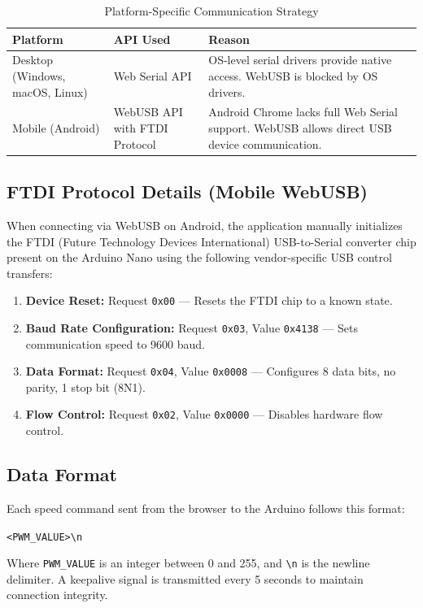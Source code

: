 \documentclass[12pt,a4paper]{article}
\begin{document}
\begin{table}[H]
\centering
\renewcommand{\arraystretch}{1.4}
\begin{tabular}{|>{\raggedright}p{3cm}|>{\raggedright}p{3.5cm}|>{\raggedright\arraybackslash}p{6cm}|}
\hline
\textbf{Platform} & \textbf{API Used} & \textbf{Reason} \\
\hline
Desktop (Windows, macOS, Linux) & Web Serial API & OS-level serial drivers provide native access. WebUSB is blocked by OS drivers. \\
\hline
Mobile (Android) & WebUSB API with FTDI Protocol & Android Chrome lacks full Web Serial support. WebUSB allows direct USB device communication. \\
\hline
\end{tabular}
\caption{Platform-Specific Communication Strategy}
\label{tab:protocol}
\end{table}

\subsection{FTDI Protocol Details (Mobile WebUSB)}
When connecting via WebUSB on Android, the application manually initializes the FTDI (Future Technology Devices International) USB-to-Serial converter chip present on the Arduino Nano using the following vendor-specific USB control transfers:

\begin{enumerate}
    \item \textbf{Device Reset:} Request \texttt{0x00} --- Resets the FTDI chip to a known state.
    \item \textbf{Baud Rate Configuration:} Request \texttt{0x03}, Value \texttt{0x4138} --- Sets communication speed to 9600 baud.
    \item \textbf{Data Format:} Request \texttt{0x04}, Value \texttt{0x0008} --- Configures 8 data bits, no parity, 1 stop bit (8N1).
    \item \textbf{Flow Control:} Request \texttt{0x02}, Value \texttt{0x0000} --- Disables hardware flow control.
\end{enumerate}

\subsection{Data Format}
Each speed command sent from the browser to the Arduino follows this format:
\begin{center}
\texttt{<PWM\_VALUE>\textbackslash n}
\end{center}
Where \texttt{PWM\_VALUE} is an integer between 0 and 255, and \texttt{\textbackslash n} is the newline delimiter. A keepalive signal is transmitted every 5 seconds to maintain connection integrity.
\end{document}
